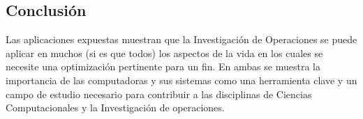 \documentclass[letterpaper, 12pt]{article}
\begin{document}
\begin{justify}
        \section{Conclusión}
        \justify
        Las aplicaciones expuestas muestran que la Investigación de Operaciones se puede aplicar en muchos (si es que todos) los aspectos de la vida en los cuales se necesite una optimización pertinente para un fin. En ambas se muestra la importancia de las computadoras
        y sus sistemas como una herramienta clave y un campo de estudio necesario para contribuir a las disciplinas de Ciencias Computacionales y la Investigación de operaciones.
    \end{justify}

    \newpage
        \lhead{}
        \printbibliography
\end{document}
